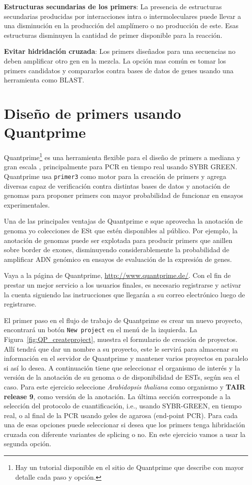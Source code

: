 \documentclass[letter,11pt]{book}
\begin{document}
\textbf{Estructuras secundarias de los primers}: La presencia de estructuras secundarias producidas por interacciones intra o intermoleculares puede llevar a una disminución en la producción del amplímero o no producción de este. Esas estructuras disminuyen la cantidad de primer disponible para la reacción.

\textbf{Evitar hidridación cruzada}: Los primers diseñados para una secuencias no deben amplificar otro gen en la mezcla. La opción mas común es tomar los primers candidatos y compararlos contra bases de datos de genes usando una herramienta como BLAST.

\section{Diseño de primers usando Quantprime}

{\sc Quantprime}\footnote{Hay un tutorial disponible en el sitio de {\sc Quantprime} que describe con mayor detalle cada paso y opción.} es una herramienta flexible para el diseño de primers a mediana y gran escala \citep{Arvidsson2008}, principalmente para PCR en tiempo real usando SYBR GREEN. {\sc Quantprime} usa \Verb+primer3+ \citep{Rozen2000}  como motor para la creación de primers y agrega diversas capaz de verificación contra distintas bases de datos y anotación de genomas para proponer primers con mayor probabilidad de funcionar en ensayos experimentales.

Una de las principales ventajas de {\sc Quantprime} e sque aprovecha la anotación de genoma y\/o colecciones de ESt que estén disponibles al público. Por ejemplo, la anotación de genomas puede ser explotada para producir primers que anillen sobre border de exones, disminuyendo considerablemente la probabilidad de amplificar ADN genómico en ensayos de evaluación de la expresión de genes.

Vaya a la página de {\sc Quantprime}, \url{http://www.quantprime.de/}. Con el fin de prestar un mejor servicio a los usuarios finales, es necesario registrarse y activar la cuenta siguiendo las instrucciones que llegarán a su correo electrónico luego de registrarse.

El primer paso en el flujo de trabajo de {\sc Quantprime} es crear un nuevo proyecto, encontrará un botón \Verb+New project+ en el menú de la izquierda. La Figura~\ref{fig:QP_createproject}, muestra el formulario de creación de proyectos. Allí tendrá que dar un nombre a su proyecto, este le servirá para almacenar su información en el servidor de  {\sc Quantprime} y mantener varios proyectos en paralelo si así lo desea. A continuación tiene que seleccionar el organismo de interés y la versión de la anotación de su genoma o de disponibilidad de ESTs, según sea el caso. Para este ejercicio seleccione \textit{Arabidopsis thaliana} como organismo y \textbf{TAIR release 9}, como versión de la anotación. La última sección corresponde a la selección del protocolo de cuantificación, i.e., usando SYBR-GREEN, en tiempo real, o al final de la PCR usando geles de agarosa (end-point  PCR). Para cada una de esas opciones puede seleccionar si desea que los primers tenga hibridación cruzada con diferente variantes de splicing o no. En este ejercicio vamos a usar la segunda opción.
\end{document}
